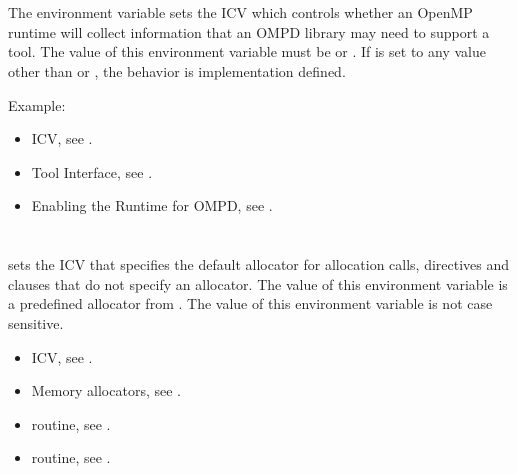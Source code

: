 \section{}
\label{sec:OMP_DEBUG}

The  environment variable sets the
 ICV which controls whether an OpenMP runtime
will collect information that an OMPD library may need to support
a tool.
The value of this environment variable must be 
or .
If  is set to any value other than 
or , the behavior is implementation defined.

Example:
\begin{ompEnv}
\end{ompEnv}

\crossreferences
\begin{itemize}
\item {} ICV,
see .
\item Tool Interface, see .
\item Enabling the Runtime for OMPD, see .
\end{itemize}


\section{}
\label{sec:OMP_ALLOCATOR}

 sets the  ICV that specifies the default
allocator for allocation calls, directives and clauses that do not specify an allocator.
The value of this environment variable is a predefined allocator from . The value of this environment variable is not case sensitive.

\crossreferences
\begin{itemize}
\item {} ICV, see .

\item Memory allocators, see .

\item {} routine, see .

\item {} routine, see .
\end{itemize}


